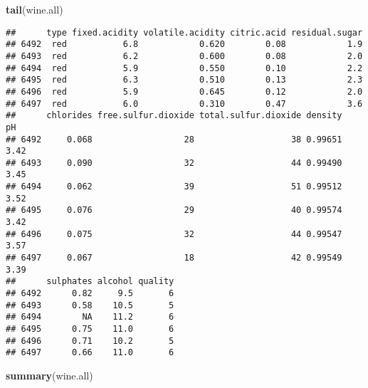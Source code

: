 \documentclass[]{article}
\newenvironment{Shaded}{\begin{snugshade}}{\end{snugshade}}
\newcommand{\KeywordTok}[1]{\textcolor[rgb]{0.13,0.29,0.53}{\textbf{#1}}}
\newcommand{\NormalTok}[1]{#1}
\begin{document}
\begin{Shaded}
\begin{Highlighting}[]
\KeywordTok{tail}\NormalTok{(wine.all)}
\end{Highlighting}
\end{Shaded}

\begin{verbatim}
##      type fixed.acidity volatile.acidity citric.acid residual.sugar
## 6492  red           6.8            0.620        0.08            1.9
## 6493  red           6.2            0.600        0.08            2.0
## 6494  red           5.9            0.550        0.10            2.2
## 6495  red           6.3            0.510        0.13            2.3
## 6496  red           5.9            0.645        0.12            2.0
## 6497  red           6.0            0.310        0.47            3.6
##      chlorides free.sulfur.dioxide total.sulfur.dioxide density   pH
## 6492     0.068                  28                   38 0.99651 3.42
## 6493     0.090                  32                   44 0.99490 3.45
## 6494     0.062                  39                   51 0.99512 3.52
## 6495     0.076                  29                   40 0.99574 3.42
## 6496     0.075                  32                   44 0.99547 3.57
## 6497     0.067                  18                   42 0.99549 3.39
##      sulphates alcohol quality
## 6492      0.82     9.5       6
## 6493      0.58    10.5       5
## 6494        NA    11.2       6
## 6495      0.75    11.0       6
## 6496      0.71    10.2       5
## 6497      0.66    11.0       6
\end{verbatim}

\begin{Shaded}
\begin{Highlighting}[]
\KeywordTok{summary}\NormalTok{(wine.all)}
\end{Highlighting}
\end{Shaded}
\end{document}
